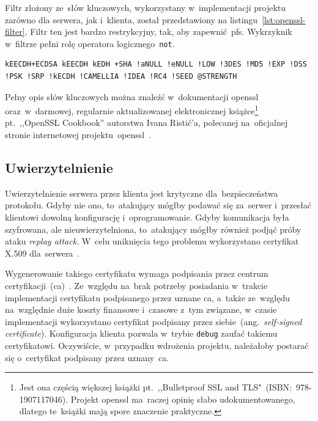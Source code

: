\documentclass[thesis]{subfiles}
\begin{document}
Filtr złożony ze~słów kluczowych, wykorzystany w~implementacji projektu zarówno dla serwera, jak i~klienta, został przedstawiony na listingu~\ref{lst:openssl-filter}. Filtr ten jest bardzo restrykcyjny, tak, aby zapewnić~\gls{pfs}. Wykrzyknik w~filtrze pełni rolę operatora logicznego~\texttt{not}.\\

\begin{lstlisting}[numbers=none,caption={Filtr \gls{openssl} dla algorytmów użytych w~projekcie},label=lst:openssl-filter]
kEECDH+ECDSA kEECDH kEDH +SHA !aNULL !eNULL !LOW !3DES !MD5 !EXP !DSS !PSK !SRP !kECDH !CAMELLIA !IDEA !RC4 !SEED @STRENGTH
\end{lstlisting}

Pełny opis słów kluczowych można znaleźć w~dokumentacji \gls{openssl} oraz~w~darmowej, regularnie aktualizowanej elektronicznej książce\footnote{Jest ona częścią większej książki pt.~,,Bulletproof SSL and TLS"~(ISBN:~978-1907117046). Projekt \gls{openssl} ma~raczej opinię słabo udokumentowanego, dlatego te~książki mają spore znaczenie praktyczne.} pt.~,,OpenSSL Cookbook'' autorstwa Ivana Ristić'a, polecanej na~oficjalnej stronie internetowej projektu~\gls{openssl}~\cite{openssl-cookbook-suites}.


\subsection{Uwierzytelnienie}

Uwierzytelnienie serwera przez klienta jest krytyczne dla~bezpieczeństwa protokołu. Gdyby nie ono, to~atakujący mógłby podawać się za~serwer i~przesłać klientowi dowolną konfigurację i~oprogramowanie. Gdyby komunikacja była szyfrowana, ale nieuwierzytelniona, to~atakujący mógłby również podjąć próby ataku \emph{replay attack}. W~celu uniknięcia tego problemu wykorzystano certyfikat X.509 dla~serwera~\cite{wiki:x509}.

Wygenerowanie takiego certyfikatu wymaga podpisania przez centrum certyfikacji~(\gls{ca})~\cite{wiki:ca}. Ze~względu na~brak potrzeby posiadania w~trakcie implementacji certyfikatu podpisanego przez uznane \gls{ca}, a~także ze~względu na~względnie duże koszty finansowe i~czasowe z~tym związane, w~czasie implementacji wykorzystano certyfikat podpisany przez siebie~(ang.~\emph{self-signed certificate}). Konfiguracja klienta pozwala w~trybie \texttt{debug} zaufać takiemu certyfikatowi. Oczywiście, w~przypadku wdrożenia projektu, należałoby postarać się o~certyfikat podpisany przez uznany~\gls{ca}.
\end{document}
